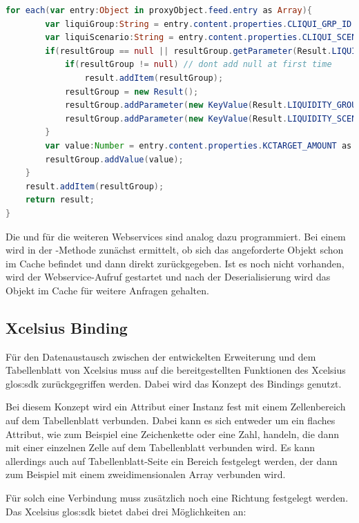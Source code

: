 \begin{onehalfspacing}
\begin{programm}[h]
\begin{lstlisting}[language=ActionScript]
	for each(var entry:Object in proxyObject.feed.entry as Array){
		var liquiGroup:String = entry.content.properties.CLIQUI_GRP_ID as String;
		var liquiScenario:String = entry.content.properties.CLIQUI_SCENARIO as String;
		if(resultGroup == null || resultGroup.getParameter(Result.LIQUIDITY_GROUP) != liquiGroup || resultGroup.getParameter(Result.LIQUIDITY_SCENARIO) != liquiScenario){
			if(resultGroup != null) // dont add null at first time
				result.addItem(resultGroup);
			resultGroup = new Result();
			resultGroup.addParameter(new KeyValue(Result.LIQUIDITY_GROUP,liquiGroup));
			resultGroup.addParameter(new KeyValue(Result.LIQUIDITY_SCENARIO,liquiScenario));
		}
		var value:Number = entry.content.properties.KCTARGET_AMOUNT as Number;
		resultGroup.addValue(value);
	}
	result.addItem(resultGroup);
	return result;
}
\end{lstlisting}
\caption{Deserialisierung des XML-Format in die interne Objektstruktur\label{listing:deserialisierung}}
\end{programm}


Die  und  für die weiteren Webservices sind analog dazu programmiert. Bei einem  wird in der -Methode zunächst ermittelt, ob sich das angeforderte Objekt schon im Cache befindet und dann direkt zurückgegeben. Ist es noch nicht vorhanden, wird der Webservice-Aufruf gestartet und nach der Deserialisierung wird das Objekt im Cache für weitere Anfragen gehalten.

\subsection{\gls{Xcelsius} Binding}
\label{sec:xcelsius_binding}
Für den Datenaustausch zwischen der entwickelten Erweiterung und dem Tabellenblatt von \gls{Xcelsius} muss auf die bereitgestellten Funktionen des \gls{Xcelsius} \gls{glos:sdk} zurückgegriffen werden. Dabei wird das Konzept des Bindings genutzt.

Bei diesem Konzept wird ein Attribut einer Instanz fest mit einem Zellenbereich auf dem Tabellenblatt verbunden. Dabei kann es sich entweder um ein flaches Attribut, wie zum Beispiel eine Zeichenkette oder eine Zahl, handeln, die dann mit einer einzelnen Zelle auf dem Tabellenblatt verbunden wird. Es kann allerdings auch auf Tabellenblatt-Seite ein Bereich festgelegt werden, der dann zum Beispiel mit einem zweidimensionalen Array verbunden wird.

Für solch eine Verbindung muss zusätzlich noch eine Richtung festgelegt werden. Das \gls{Xcelsius} \gls{glos:sdk} bietet dabei drei Möglichkeiten an:


\end{onehalfspacing}
